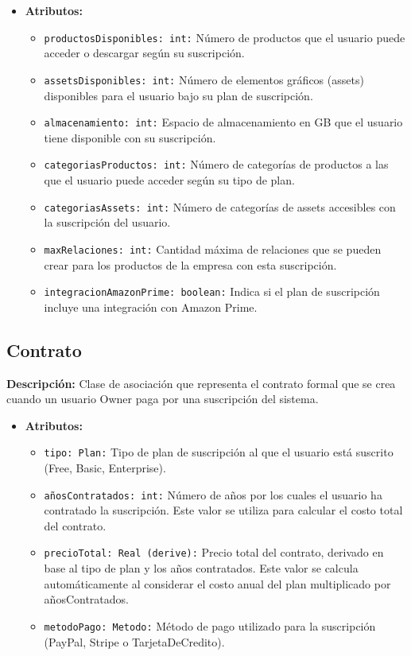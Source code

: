 \documentclass[12pt.a4paper]{article}
\begin{document}
    \begin{itemize}
        \item {\textbf{Atributos:}}
        \begin{itemize}
            \item \texttt{productosDisponibles: int:} Número de productos que el usuario puede acceder o descargar según su suscripción.
            \item \texttt{assetsDisponibles: int:} Número de elementos gráficos (assets) disponibles para el usuario bajo su plan de suscripción.
            \item \texttt{almacenamiento: int:} Espacio de almacenamiento en GB que el usuario tiene disponible con su suscripción.
            \item \texttt{categoriasProductos: int:} Número de categorías de productos a las que el usuario puede acceder según su tipo de plan.
            \item \texttt{categoriasAssets: int:} Número de categorías de assets accesibles con la suscripción del usuario.
            \item \texttt{maxRelaciones: int:} Cantidad máxima de relaciones que se pueden crear para los productos de la empresa con esta suscripción.
            \item \texttt{integracionAmazonPrime: boolean:} Indica si el plan de suscripción incluye una integración con Amazon Prime.
        \end{itemize}
    \end{itemize}

\subsection{Contrato}
\textbf{Descripción:} Clase de asociación que representa el contrato formal que se crea cuando un usuario Owner paga por una suscripción del sistema.
    \begin{itemize}
        \item {\textbf{Atributos:}}
        \begin{itemize}
            \item \texttt{tipo: Plan:} Tipo de plan de suscripción al que el usuario está suscrito (Free, Basic, Enterprise).
             \item \texttt{añosContratados: int:} Número de años por los cuales el usuario ha contratado la suscripción. Este valor se utiliza para calcular el costo total del contrato.
             \item \texttt{precioTotal: Real (derive):} Precio total del contrato, derivado en base al tipo de plan y los años contratados. Este valor se calcula automáticamente al considerar el costo anual del plan multiplicado por añosContratados.
             \item \texttt{metodoPago: Metodo:} Método de pago utilizado para la suscripción (PayPal, Stripe o TarjetaDeCredito).
        \end{itemize}
    \end{itemize}
\end{document}
